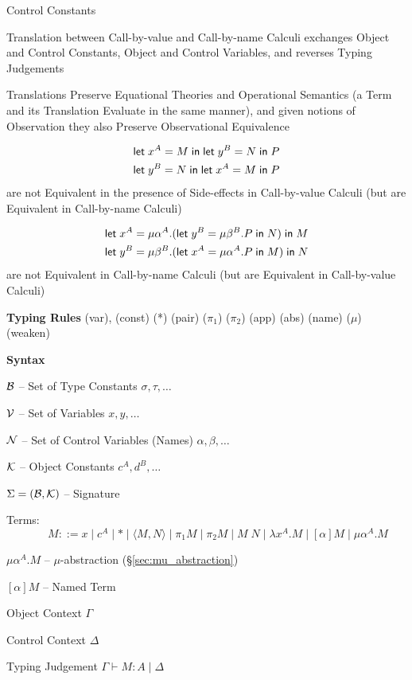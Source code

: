 Control Constants %

Translation between Call-by-value and Call-by-name Calculi exchanges
Object and Control Constants, Object and Control Variables, and
reverses Typing Judgements

Translations Preserve Equational Theories and Operational Semantics (a
Term and its Translation Evaluate in the same manner), and given
notions of Observation they also Preserve Observational Equivalence

\begin{align*}
  & \mathsf{let}\;x^A = M\;\mathsf{in}\;\mathsf{let}\;y^B = N\;\mathsf{in}\;P \\
  & \mathsf{let}\;y^B = N\;\mathsf{in}\;\mathsf{let}\;x^A = M\;\mathsf{in}\;P
\end{align*}
are not Equivalent in the presence of Side-effects in Call-by-value
Calculi (but are Equivalent in Call-by-name Calculi)

\begin{align*}
  & \mathsf{let}\;x^A = \mu\alpha^A.
    (\mathsf{let}\;y^B = \mu\beta^B.P\;\mathsf{in}\;N)\;\mathsf{in}\;M \\
  & \mathsf{let}\;y^B = \mu\beta^B.
    (\mathsf{let}\;x^A = \mu\alpha^A.P\;\mathsf{in}\;M)\;\mathsf{in}\;N
\end{align*}
are not Equivalent in Call-by-name Calculi (but are Equivalent in
Call-by-value Calculi)


\textbf{Typing Rules} (var), (const) (*) (pair) ($\pi_1$) ($\pi_2$)
(app) (abs) (name) ($\mu$) (weaken) %


\textbf{Syntax}

$\mathcal{B}$ -- Set of Type Constants $\sigma,\tau,\ldots$

$\mathcal{V}$ -- Set of Variables $x,y,\ldots$

$\mathcal{N}$ -- Set of Control Variables (Names) $\alpha,\beta,\ldots$

$\mathcal{K}$ -- Object Constants $c^A,d^B,\ldots$

$\Sigma = (\mathcal{B},\mathcal{K})$ -- Signature

Terms:
\[
  \quad\quad M ::= x \mid c^A \mid * \mid \langle M,N \rangle
    \mid \pi_1 M \mid \pi_2 M \mid M\;N \mid \lambda x^A.M
    \mid [\alpha]M \mid \mu\alpha^A.M
\]

$\mu\alpha^A.M$ -- $\mu$-abstraction (\S\ref{sec:mu_abstraction})

$[\alpha]M$ -- Named Term

Object Context $\Gamma$

Control Context $\Delta$

Typing Judgement $\Gamma \vdash M:A \mid \Delta$

